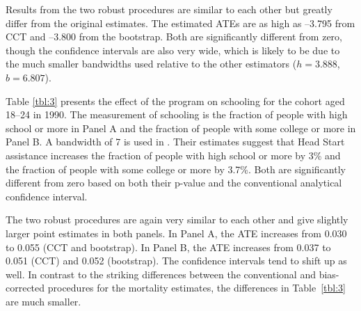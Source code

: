 \documentclass[12pt,fleqn]{article}
\begin{document}
Results from the two robust procedures are similar to each other but greatly
differ from the original estimates. The estimated ATEs are as high as --3.795
from CCT and --3.800 from the bootstrap. Both are significantly different from
zero, though the confidence intervals are also very wide, which is likely to be
due to the much smaller bandwidths used relative to the other estimators
($h=3.888$, $b=6.807$).

Table \ref{tbl:3} presents the effect of the program on schooling for the cohort
aged 18--24 in 1990. The measurement of schooling is the fraction of people with
high school or more in Panel A and the fraction of people with some college or
more in Panel B. A bandwidth of 7 is used in \cite{ludwig2007}. Their estimates
suggest that Head Start assistance increases the fraction of people with high
school or more by 3\% and the fraction of people with some college or more by
3.7\%. Both are significantly different from zero based on both their p-value
and the conventional analytical confidence interval.

The two robust procedures are again very similar to each other and give slightly
larger point estimates in both panels. In Panel A, the ATE increases from 0.030
to 0.055 (CCT and bootstrap). In Panel B, the ATE increases from 0.037
to 0.051 (CCT) and 0.052 (bootstrap). The confidence intervals tend to shift up
as well.  In contrast to the striking differences between the conventional
and bias-corrected procedures for the mortality estimates, the differences
in Table~\ref{tbl:3} are much smaller.
\end{document}
